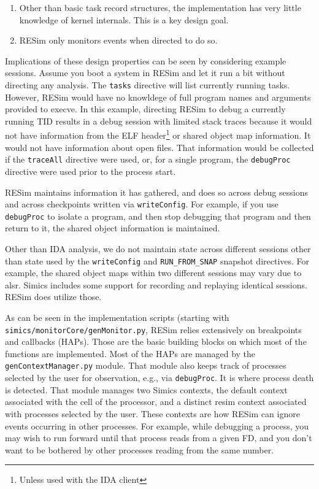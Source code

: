 \documentclass[titlepage]{article}
\begin{document}
\begin{enumerate}
\item Other than basic task record structures, the implementation has very little knowledge of kernel internals.
This is a key design goal.  
\item RESim only monitors events when directed to do so.
\end{enumerate}
\noindent Implications of these design properties can be seen by considering example sessions.  Assume you boot a system in RESim and let it run a bit without
directing any analysis.  The {\tt tasks} directive will list currently running tasks.  However, RESim would have no knowldege of full program names and arguments
provided to execve.  In this example, directing RESim to debug a currently running TID results in a debug session with limited stack traces because
it would not have information from the ELF header\footnote{Unless used with the IDA client}  or shared object map information.  It would not have
information about open files.
That information would be collected if the {\tt traceAll} directive were used, or, for a single program, the {\tt debugProc} directive were used prior to the
process start.

RESim maintains information it has gathered, and does so across debug sessions and across checkpoints written via {\tt writeConfig}.  For example, if you
use {\tt debugProc} to isolate a program, and then stop debugging that program and then return to it, the shared object information is maintained.

Other than IDA analysis, we do not maintain state across different sessions other than state used by the {\tt writeConfig} and {\tt RUN\_FROM\_SNAP} snapshot directives.
For example, the shared object maps within two different sessions may vary due to alsr.  Simics includes some support for recording and replaying identical sessions.  
RESim does utilize those.

As can be seen in the implementation scripts (starting with {\tt simics/monitorCore/genMonitor.py}, RESim relies extensively on breakpoints and callbacks (HAPs).  
Those are the basic building blocks on which most of the functions are implemented.  Most of the HAPs are managed by the {\tt genContextManager.py} module.  That module also
keeps track of processes selected by the user for observation, e.g., via {\tt debugProc}.  It is where process death is detected.  That module manages two Simics contexts,
the default context associated with the cell of the processor, and a distinct resim context associated with processes selected by the user.  These contexts are how RESim can 
ignore events occurring in other processes.  For example, while debugging a process, you may wish to run forward until that process reads from a given FD, and you don't want
to be bothered by other processes reading from the same number.
\end{document}

